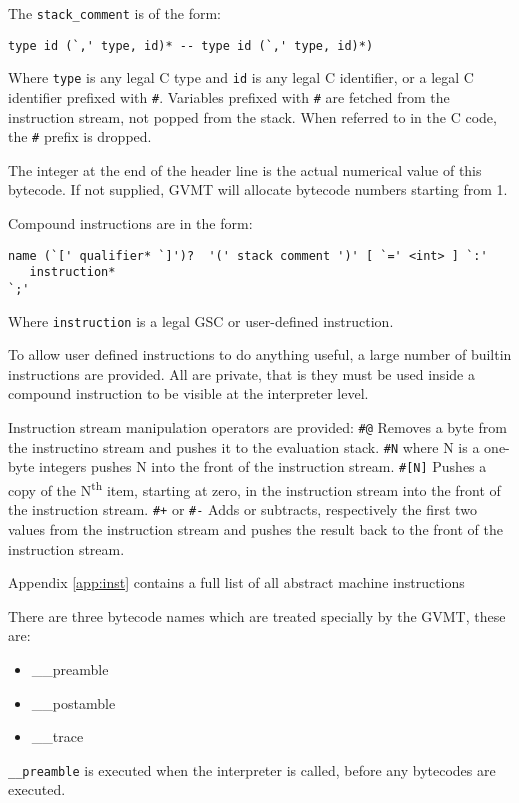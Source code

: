 The \verb|stack_comment| is of the form:
 \begin{verbatim}
type id (`,' type, id)* -- type id (`,' type, id)*)
\end{verbatim}

Where \verb|type| is any legal C type and \verb|id| is any legal C identifier, or a legal C identifier prefixed with \verb|#|. Variables prefixed with \verb|#| are fetched from the instruction stream, not popped from the stack. When referred to in the C code, the \verb|#| prefix is dropped.

The integer at the end of the header line is the actual numerical value of this bytecode. If not supplied, GVMT will allocate bytecode numbers starting from 1.

Compound instructions are in the form:
\begin{verbatim}
name (`[' qualifier* `]')?  '(' stack comment ')' [ `=' <int> ] `:'
   instruction*
`;'
\end{verbatim}

Where \verb|instruction| is a legal GSC or user-defined instruction.

To allow user defined instructions to do anything useful, a large number of builtin instructions are provided. All are private, that is they must be used inside a compound instruction to be visible at the interpreter level. 

Instruction stream manipulation operators are provided:
\verb|#@| Removes a byte from the instructino stream and pushes it to the evaluation stack.
\verb|#N| where N is a one-byte integers pushes N into the front of the instruction stream.
\verb|#[N]| Pushes a copy of the N\textsuperscript{th} item, starting at zero, in the instruction stream into the front of the instruction stream.
\verb|#+| or \verb|#-| Adds or subtracts, respectively the first two values from the instruction stream  and pushes the result back to the front of the instruction stream.

Appendix \ref{app:inst} contains a full list of all abstract machine instructions 

There are three bytecode names which are treated specially by the GVMT, these are:
\begin{itemize}
\item \_\_preamble 
\item \_\_postamble
\item \_\_trace
\end{itemize}
\verb|__preamble| is executed when the interpreter is called, before any bytecodes are executed.

